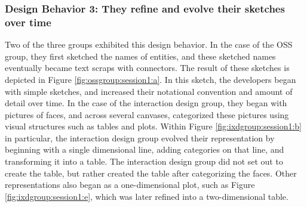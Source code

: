 %
%
%
%
%
%
%
%

\subsubsection{Design Behavior 3: They refine and evolve their sketches over time}

Two of the three groups exhibited this design behavior. In the case of the OSS group, they first sketched the names of entities, and these sketched names eventually became text scraps with connectors. The result of these sketches is depicted in Figure \ref{fig:ossgroup:session1:a}. In this sketch, the developers began with simple sketches, and increased their notational convention and amount of detail over time. In the case of the interaction design group, they began with pictures of faces, and across several canvases, categorized these pictures using visual structures such as tables and plots. Within Figure \ref{fig:ixdgroup:session1:b} in particular, the interaction design group evolved their representation by beginning with a single dimensional line, adding categories on that line, and transforming it into a table. The interaction design group did not set out to create the table, but rather created the table after categorizing the faces. Other representations also began as a one-dimensional plot, such as Figure \ref{fig:ixdgroup:session1:e}, which was later refined into a two-dimensional table.

